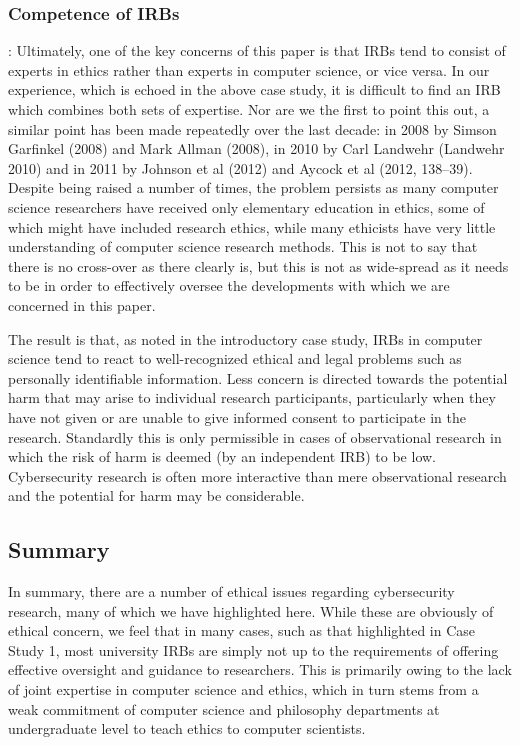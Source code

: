 \documentclass{svjour3}                     %
\begin{document}
\subsubsection{Competence of IRBs}:
Ultimately, one of the key concerns of this paper is that IRBs tend to consist of experts in ethics rather than experts in computer science, or vice versa.  In our experience, which is echoed in the above case study, it is difficult to find an IRB which combines both sets of expertise. Nor are we the first to point this out, a similar point has been made repeatedly over the last decade: in 2008 by Simson Garfinkel (2008) and Mark Allman (2008), in 2010 by Carl Landwehr (Landwehr 2010) and in 2011 by Johnson et al (2012) and Aycock et al (2012, 138–39). Despite being raised a number of times, the problem persists as many computer science researchers have received only elementary education in ethics, some of which might have included research ethics, while many ethicists have very little understanding of computer science research methods. This is not to say that there is no cross-over as there clearly is, but this is not as wide-spread as it needs to be in order to effectively oversee the developments with which we are concerned in this paper.

The result is that, as noted in the introductory case study, IRBs in computer science tend to react to well-recognized ethical and legal problems such as personally identifiable information. Less concern is directed towards the potential harm that may arise to individual research participants, particularly when they have not given or are unable to give informed consent to participate in the research. Standardly this is only permissible in cases of observational research in which the risk of harm is deemed (by an independent IRB) to be low. Cybersecurity research is often more interactive than mere observational research and the potential for harm may be considerable.

\subsection{Summary}
\label{sec:summary}
In summary, there are a number of ethical issues regarding cybersecurity research, many of which we have highlighted here.  While these are obviously of ethical concern, we feel that in many cases, such as that highlighted in Case Study 1, most university IRBs are simply not up to the requirements of offering effective oversight and guidance to researchers. This is primarily owing to the lack of joint expertise in computer science and ethics, which in turn stems from a weak commitment of computer science and philosophy departments at undergraduate level to teach ethics to computer scientists.
\end{document}
